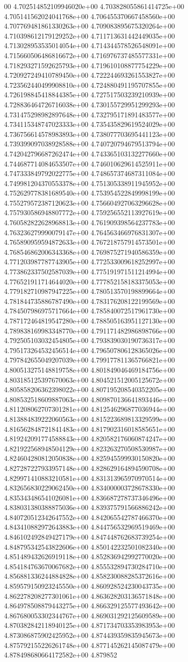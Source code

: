 00	4.702514852109946020e+00	4.703828055861414725e+00	4.705141562024041768e+00	4.706455370667458560e+00	4.707769481861330263e+00	4.709083895675320264e+00	4.710398612179129252e+00	4.711713631442449035e+00	4.713028953535014054e+00	4.714344578526548091e+00	4.715660506486816672e+00	4.716976737485577331e+00	4.718293271592625793e+00	4.719610108877754229e+00	4.720927249410789450e+00	4.722244693261553827e+00	4.723562440499908810e+00	4.724880491195707855e+00	4.726198845418844385e+00	4.727517503239210939e+00	4.728836464726716038e+00	4.730155729951299293e+00	4.731475298982897648e+00	4.732795171891483577e+00	4.734115348747023333e+00	4.735435829619524029e+00	4.736756614578983893e+00	4.738077703695441123e+00	4.739399097038928588e+00	4.740720794679513794e+00	4.742042796687262474e+00	4.743365103132277660e+00	4.744687714084653507e+00	4.746010629614525911e+00	4.747333849792022775e+00	4.748657374687311084e+00	4.749981204370553378e+00	4.751305338911945952e+00	4.752629778381689540e+00	4.753954522849998199e+00	4.755279572387120623e+00	4.756604927063296628e+00	4.757930586948807772e+00	4.759256552113927619e+00	4.760582822628968813e+00	4.761909398564237783e+00	4.763236279990079147e+00	4.764563466976831307e+00	4.765890959594872633e+00	4.767218757914573501e+00	4.768546862006343368e+00	4.769875271940586359e+00	4.771203987787743905e+00	4.772533009618252997e+00	4.773862337502587039e+00	4.775191971511214994e+00	4.776521911714644020e+00	4.777852158183375053e+00	4.779182710987947225e+00	4.780513570198899664e+00	4.781844735886787490e+00	4.783176208122199569e+00	4.784507986975717664e+00	4.785840072517961730e+00	4.787172464819547280e+00	4.788505163951127130e+00	4.789838169983348770e+00	4.791171482986898766e+00	4.792505103032454805e+00	4.793839030190736317e+00	4.795173264532456514e+00	4.796507806128365026e+00	4.797842655049207039e+00	4.799177811365766821e+00	4.800513275148819758e+00	4.801849046469184756e+00	4.803185125397670063e+00	4.804521512005125672e+00	4.805858206362398022e+00	4.807195208540352205e+00	4.808532518609887063e+00	4.809870136641893446e+00	4.811208062707301281e+00	4.812546296877036944e+00	4.813884839222060563e+00	4.815223689813329599e+00	4.816562848721841483e+00	4.817902316018585651e+00	4.819242091774588843e+00	4.820582176060874247e+00	4.821922568948504129e+00	4.823263270508530987e+00	4.824604280812050838e+00	4.825945599930150820e+00	4.827287227933957148e+00	4.828629164894590708e+00	4.829971410883210581e+00	4.831313965970970514e+00	4.832656830229062450e+00	4.834000003728678330e+00	4.835343486541026081e+00	4.836687278737346496e+00	4.838031380388875036e+00	4.839375791566886242e+00	4.840720512342647552e+00	4.842065542787466370e+00	4.843410882972643883e+00	4.844756532969519469e+00	4.846102492849427179e+00	4.847448762683739254e+00	4.848795342543822606e+00	4.850142232501082340e+00	4.851489432626919118e+00	4.852836942992770020e+00	4.854184763670067682e+00	4.855532894730284710e+00	4.856881336244884828e+00	4.858230088285372616e+00	4.859579150923245550e+00	4.860928524230043735e+00	4.862278208277301061e+00	4.863628203136571848e+00	4.864978508879443275e+00	4.866329125577493642e+00	4.867680053302344767e+00	4.869031292125609589e+00	4.870382842118940125e+00	4.871734703353983953e+00	4.873086875902425952e+00	4.874439359835945673e+00	4.875792155226261748e+00	4.877145262145087479e+00	4.878498680664172582e+00	4.879852